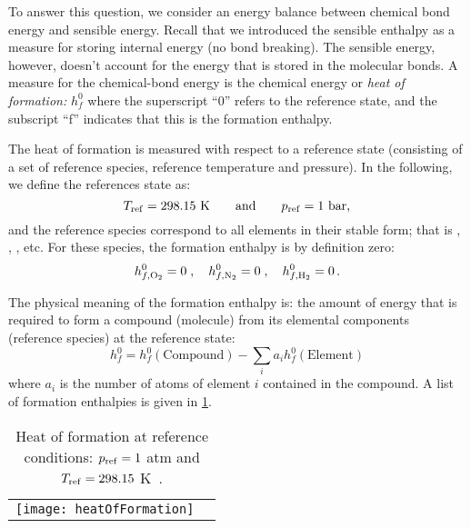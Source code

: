 To answer this question, we consider an energy balance between chemical bond energy and sensible energy. Recall that we introduced the sensible enthalpy as a measure for storing internal energy (no bond breaking). The sensible energy, however, doesn't account for the energy that is stored in the molecular bonds. A measure for the chemical-bond energy is the chemical energy or {\it heat of formation:} ${h}^0_f$ where the superscript ``0'' refers to the reference state, and the subscript ``f'' indicates that this is the formation enthalpy.

The heat of formation is measured with respect to a reference state (consisting of a set of reference species, reference temperature and pressure). In the following, we define the references state as:
\[
  T_{\rm{ref}} = 298.15 \text{ K}\qquad\text{and}\qquad p_{\rm{ref}} = 1 \text{ bar,}
\]
and the reference species correspond to all elements in their stable form; that is , , , etc. For these species, the formation enthalpy is by definition zero:
\[
  h^0_{f,\mathrm{O_2}}=0\;,\quad h^0_{f,\mathrm{N_2}}=0\;,\quad h^0_{f,\mathrm{H_2}}=0 \, \text{.}
\]

The physical meaning of the formation enthalpy is: the amount of energy that is required to form a compound (molecule) from its elemental components (reference species) at the reference state:
\[
    h^0_f = h^0_f(\text{Compound}) - \sum_i a_i h^0_f(\text{Element})
\]
where $a_i$ is the number of atoms of element $i$ contained in the compound. A list of formation enthalpies is given in \cref{FIG_HEAT_OF_FORMATIONS}.

\begin{table}[!t!]
  \begin{center}
    \begin{tabular}{cc}
      \texttt{[image: heatOfFormation]}
    \end{tabular}
    \caption{\label{FIG_HEAT_OF_FORMATIONS}Heat of formation at reference conditions: $p_{\rm{ref}}=1$ atm and $T_{\rm{ref}}=298.15$ K~\cite{LAW_BOOK2006}.}
  \end{center}
\end{table}

